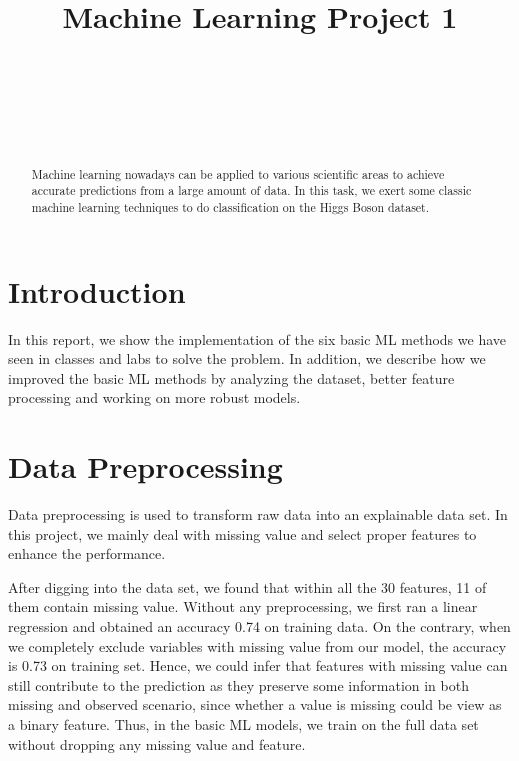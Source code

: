 \documentclass[10pt,conference,compsocconf]{IEEEtran}
\begin{document}
\title{Machine Learning Project 1}

\author{
  \\
  \and
  \\
  \and
  \\
}

\maketitle

\begin{abstract}

Machine learning nowadays can be applied to various scientific areas to achieve accurate predictions from a large amount of data. In this task, we exert some classic machine learning techniques to do classification on the Higgs Boson dataset.

\end{abstract}

\section{Introduction}

In this report, we show the implementation of the six basic ML methods we have seen in classes and labs to solve the problem. In addition, we describe how we improved the basic ML methods by analyzing the dataset, better feature processing and working on more robust models.

\section{Data Preprocessing}

Data preprocessing is used to transform raw data into an explainable data set. In this project, we mainly deal with missing value and select proper features to enhance the performance.

After digging into the data set, we found that within all the 30 features, 11 of them contain missing value. Without any preprocessing, we first ran a linear regression and obtained an accuracy 0.74 on training data. On the contrary, when we completely exclude variables with missing value from our model, the accuracy is 0.73 on training set.  Hence, we could infer that features with missing value can still contribute to the prediction as they preserve some information in both missing and observed scenario, since whether a value is missing could be view as a binary feature. Thus, in the basic ML models, we train on the full data set without dropping any missing value and feature.
\end{document}
